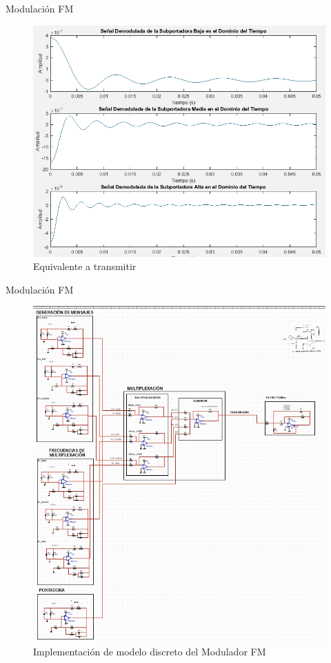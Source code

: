 \documentclass[mathserif,spanish]{beamer}
\begin{document}
\begin{frame}{Modulación FM}
    \begin{figure}[h]
        \centering
        \includegraphics[scale=0.3]{signal_demo.png}
        \caption{Equivalente a transmitir}
    \end{figure}

\end{frame}






\begin{frame}{Modulación FM}
    \begin{figure}[h]
        \centering
        \includegraphics[scale=0.3]{multisim_modul.png}
        \caption{Implementación de modelo discreto del Modulador FM}
    \end{figure}

\end{frame}
\end{document}
